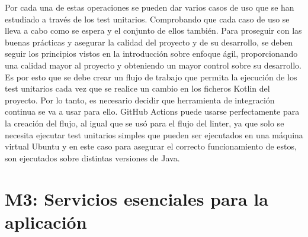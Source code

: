 Por cada una de estas operaciones se pueden dar varios casos de uso que se han estudiado a través de 
los test unitarios. Comprobando que cada caso de uso se lleva a cabo como se espera y el conjunto de 
ellos también. Para proseguir con las buenas prácticas y asegurar la calidad del proyecto y de su desarrollo, 
se deben seguir los principios vistos en la introducción sobre enfoque ágil, proporcionando una calidad mayor al 
proyecto y obteniendo un mayor control sobre su desarrollo. Es por esto que se debe crear un flujo de trabajo 
que permita la ejecución de los test unitarios cada vez que se realice un cambio en los ficheros Kotlin del 
proyecto. Por lo tanto, es necesario decidir que herramienta de integración continua se va a usar para ello. 
GitHub Actions puede usarse perfectamente para la creación del flujo, al igual que se usó para el flujo del 
linter, ya que solo se necesita ejecutar test unitarios simples que pueden ser ejecutados en una máquina virtual 
Ubuntu y en este caso para asegurar el correcto funcionamiento de estos, son ejecutados sobre distintas 
versiones de Java.

\section{M3: Servicios esenciales para la aplicación}

